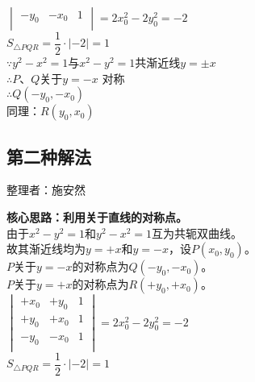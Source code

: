 \documentclass[UTF8]{ctexart}
\begin{document}
\begin{multicols}{2}
\begin{math}
\begin{vmatrix}
                -y_0&-x_0&1\\
            \end{vmatrix}=2x_0^2-2y_0^2=-2
        \end{math}\\[5mm]
        $S_{\triangle PQR}=\dfrac{1}{2}\cdot\left|-2\right|=1$\\[5mm]
        $\because y^2 - x^2 = 1 $与$ x^2 - y^2 = 1 $共渐近线$ y = \pm x$\\[5mm]
        $\therefore P、Q$关于$y = -x$ 对称\\[5mm]
        $\therefore Q(-y_0, -x_0)$\\[5mm]
        同理：$R(y_0, x_0)$\\[5mm]
    \end{multicols}

\newpage

\subsection{第二种解法}
    \begin{center}
        整理者：施安然
    \end{center}
    \begin{multicols}{2}
        \small
        \textbf{核心思路：利用关于直线的对称点。}\\[5mm]
        由于$x^2-y^2=1$和$y^2-x^2=1$互为共轭双曲线。\\[5mm]
        故其渐近线均为$y=+x$和$y=-x$，设$P(x_0,y_0)$。\\[5mm]
        $P$关于$y=-x$的对称点为$Q(-y_0,-x_0)$。\\[5mm]
        $P$关于$y=+x$的对称点为$R(+y_0,+x_0)$。\\[5mm]
        \begin{math}
            \begin{vmatrix}
                +x_0&+y_0&1\\
                +y_0&+x_0&1\\
                -y_0&-x_0&1\\
            \end{vmatrix}=2x_0^2-2y_0^2=-2
        \end{math}\\[5mm]
        $S_{\triangle PQR}=\dfrac{1}{2}\cdot\left|-2\right|=1$\\[5mm]
        \newpage
    \end{multicols}

\newpage
\end{document}
